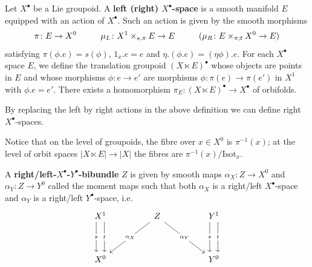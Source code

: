 \documentclass[psamsfonts]{amsart}
\theoremstyle{plain}
\theoremstyle{definition}{
\newtheorem{defi}{Definition}[section]
\newtheorem{ass}{Assumption}
\newtheorem*{nota}{Notation}}
\theoremstyle{remark}{
\newtheorem{rem}{Remark}
\newtheorem{ex}{Example}}
\theoremstyle{plain}{
\newtheorem{thm}{Theorem}[section]
\newtheorem{lem}{Lemma}[section]
\newtheorem{cor}{Corollary}[section]
\newtheorem{prop}{Proposition}[section]
\newtheorem{con}{Conjecture}[section]}
\newcommand{\m}[1]{{\mathrm{#1}}}
\begin{document}
\begin{defi}
Let $X^\bullet$ be a Lie groupoid. A \textbf{left (right) $X^\bullet$-space} is a smooth manifold $E$ equipped with an action of $X^\bullet$. Such an action is given by the smooth morphisms  
\begin{align*}
    \pi\colon E\rightarrow X^0\hspace{1.0cm}\mu_L\colon X^1\times_{s,\pi}E\rightarrow E\hspace{1.0cm}(\mu_R\colon E\times_{\pi;t}X^0\rightarrow E)
\end{align*}
satisfying $\pi(\phi.e)=s(\phi)$, $1_x.e=e$ and $\eta.(\phi.e)=(\eta\phi).e$. For each $X^\bullet$ space $E$, we define the translation groupoid $( X\ltimes E)^\bullet$ whose objects are points in $E$ and whose morphisms $\phi\colon e\rightarrow e'$ are morphisms $\phi\colon \pi(e)\rightarrow\pi(e')$ in $X^1$ with $\phi.e=e'$. There exists a homomorphism $\pi_E\colon (X\ltimes E)^\bullet\rightarrow X^\bullet$ of orbifolds. 
\end{defi}

\begin{rem}
By replacing the left by right actions in the above definition we can define right $X^\bullet$-spaces.
\end{rem}

\begin{rem}
Notice that on the level of groupoids, the fibre over $x\in X^0$ is $\pi^{-1}(x)$; at the level of orbit spaces $|X\ltimes E|\rightarrow |X|$ the fibres are $\pi^{-1}(x)/\m{Isot}_x$.
\end{rem}



\begin{defi}
A \textbf{right/left-$X^\bullet$-$Y^\bullet$-bibundle} $Z$ is given by smooth maps $\alpha_X\colon Z\rightarrow X^0$ and $\alpha_Y\colon Z\rightarrow Y^0$ called the moment maps such that both $\alpha_X$ is a right/left $X^\bullet$-space and $\alpha_Y$ is a right/left $Y^\bullet$-space, i.e.
\begin{equation*}
\begin{tikzcd}
	{X^1} && Z && {Y^1} \\
	\\
	{X^0} &&&& {Y^0}
	\arrow["t"{description}, shift left=2, from=1-1, to=3-1]
	\arrow["s"{description}, shift right=2, from=1-1, to=3-1]
	\arrow["{\alpha_X}"{description}, from=1-3, to=3-1]
	\arrow["{\alpha_Y}"{description}, from=1-3, to=3-5]
	\arrow["t"{description}, shift left=2, from=1-5, to=3-5]
	\arrow["s"{description}, shift right=2, from=1-5, to=3-5]
\end{tikzcd}
\end{equation*}
\end{defi}
\end{document}
